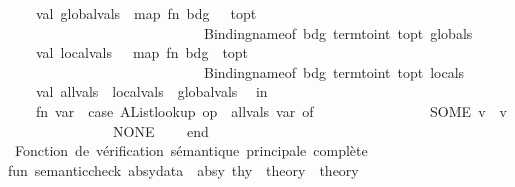 \begin{isabellebody}
\isanewline
\ \ \ \ val\ global{\isacharunderscore}{\kern0pt}vals\ {\isacharequal}{\kern0pt}\ map\ {\isacharparenleft}{\kern0pt}fn\ {\isacharparenleft}{\kern0pt}bdg{\isacharcomma}{\kern0pt}\ {\isacharunderscore}{\kern0pt}{\isacharcomma}{\kern0pt}\ {\isacharunderscore}{\kern0pt}{\isacharcomma}{\kern0pt}\ t{\isacharunderscore}{\kern0pt}opt{\isacharparenright}{\kern0pt}\ {\isacharequal}{\kern0pt}{\isachargreater}{\kern0pt}\isanewline
\ \ \ \ \ \ \ \ \ \ \ \ \ \ \ \ \ \ \ \ \ \ \ \ \ \ \ \ {\isacharparenleft}{\kern0pt}Binding{\isachardot}{\kern0pt}name{\isacharunderscore}{\kern0pt}of\ bdg{\isacharcomma}{\kern0pt}\ term{\isacharunderscore}{\kern0pt}to{\isacharunderscore}{\kern0pt}int\ t{\isacharunderscore}{\kern0pt}opt{\isacharparenright}{\kern0pt}{\isacharparenright}{\kern0pt}\ globals\isanewline
\isanewline
\ \ \ \ val\ local{\isacharunderscore}{\kern0pt}vals\ \ {\isacharequal}{\kern0pt}\ map\ {\isacharparenleft}{\kern0pt}fn\ {\isacharparenleft}{\kern0pt}{\isacharparenleft}{\kern0pt}bdg{\isacharcomma}{\kern0pt}\ {\isacharunderscore}{\kern0pt}{\isacharparenright}{\kern0pt}{\isacharcomma}{\kern0pt}\ t{\isacharunderscore}{\kern0pt}opt{\isacharparenright}{\kern0pt}\ {\isacharequal}{\kern0pt}{\isachargreater}{\kern0pt}\isanewline
\ \ \ \ \ \ \ \ \ \ \ \ \ \ \ \ \ \ \ \ \ \ \ \ \ \ \ \ {\isacharparenleft}{\kern0pt}Binding{\isachardot}{\kern0pt}name{\isacharunderscore}{\kern0pt}of\ bdg{\isacharcomma}{\kern0pt}\ term{\isacharunderscore}{\kern0pt}to{\isacharunderscore}{\kern0pt}int\ t{\isacharunderscore}{\kern0pt}opt{\isacharparenright}{\kern0pt}{\isacharparenright}{\kern0pt}\ locals\isanewline
\isanewline
\ \ \ \ val\ all{\isacharunderscore}{\kern0pt}vals\ {\isacharequal}{\kern0pt}\ local{\isacharunderscore}{\kern0pt}vals\ {\isacharat}{\kern0pt}\ global{\isacharunderscore}{\kern0pt}vals\isanewline
\ \ in\isanewline
\ \ \ \ fn\ var\ {\isacharequal}{\kern0pt}{\isachargreater}{\kern0pt}\ case\ AList{\isachardot}{\kern0pt}lookup\ {\isacharparenleft}{\kern0pt}op\ {\isacharequal}{\kern0pt}{\isacharparenright}{\kern0pt}\ all{\isacharunderscore}{\kern0pt}vals\ var\ of\isanewline
\ \ \ \ \ \ \ \ \ \ \ \ \ \ \ \ SOME\ v\ {\isacharequal}{\kern0pt}{\isachargreater}{\kern0pt}\ v\isanewline
\ \ \ \ \ \ \ \ \ \ \ \ \ \ {\isacharbar}{\kern0pt}\ NONE\ {\isacharequal}{\kern0pt}{\isachargreater}{\kern0pt}\ {}\isanewline
\ \ end\isanewline
\isanewline
{\isacharparenleft}{\kern0pt}{\isacharasterisk}{\kern0pt}\ Fonction\ de\ vérification\ sémantique\ principale\ complète\ {\isacharasterisk}{\kern0pt}{\isacharparenright}{\kern0pt}\isanewline
fun\ semantic{\isacharunderscore}{\kern0pt}check\ {\isacharparenleft}{\kern0pt}absy{\isacharunderscore}{\kern0pt}data\ {\isacharcolon}{\kern0pt}\ absy{\isacharparenright}{\kern0pt}\ {\isacharparenleft}{\kern0pt}thy\ {\isacharcolon}{\kern0pt}\ theory{\isacharparenright}{\kern0pt}\ {\isacharcolon}{\kern0pt}\ theory\ {\isacharequal}{\kern0pt}\isanewline

\end{isabellebody}
